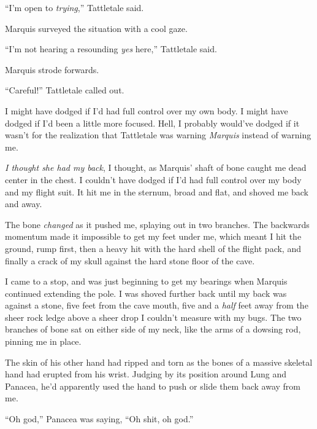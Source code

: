 ``I'm open to \emph{trying},'' Tattletale said.



Marquis surveyed the situation with a cool gaze.



``I'm not hearing a resounding \emph{yes} here,'' Tattletale said.



Marquis strode forwards.



``Careful!'' Tattletale called out.



I might have dodged if I'd had full control over my own body.  I might have dodged if I'd been a little more focused.  Hell, I probably would've dodged if it wasn't for the realization that Tattletale was warning \emph{Marquis} instead of warning me.



\emph{I thought she had my back}, I thought, as Marquis' shaft of bone caught me dead center in the chest.  I couldn't have dodged if I'd had full control over my body and my flight suit.  It hit me in the sternum, broad and flat, and shoved me back and away.



The bone \emph{changed }as it pushed me, splaying out in two branches.  The backwards momentum made it impossible to get my feet under me, which meant I hit the ground, rump first, then a heavy hit with the hard shell of the flight pack, and finally a crack of my skull against the hard stone floor of the cave.



I came to a stop, and was just beginning to get my bearings when Marquis continued extending the pole.  I was shoved further back until my back was against a stone, five feet from the cave mouth, five and a \emph{half} feet away from the sheer rock ledge above a sheer drop I couldn't measure with my bugs.  The two branches of bone sat on either side of my neck, like the arms of a dowsing rod, pinning me in place.



The skin of his other hand had ripped and torn as the bones of a massive skeletal hand had erupted from his wrist.  Judging by its position around Lung and Panacea, he'd apparently used the hand to push or slide them back away from me.



``Oh god,'' Panacea was saying, ``Oh shit, oh god.''



